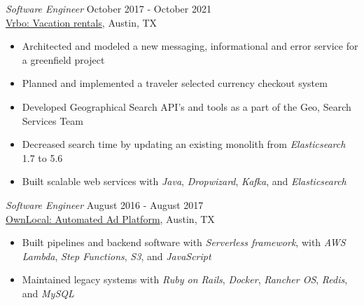 \documentclass[margin, 9pt]{res} %
\begin{document}
\begin{resume}
{\sl Software Engineer} \hfill October 2017 - October 2021 \\
\href{https://www.vrbo.com/}{Vrbo: Vacation rentals}, Austin, TX
\begin{itemize}
    \item Architected and modeled a new messaging, informational and error service for a greenfield project
    \item Planned and implemented a traveler selected currency checkout system
    \item Developed Geographical Search API's and tools as a part of the Geo, Search Services Team
    \item Decreased search time by updating an existing monolith from {\it Elasticsearch} 1.7 to 5.6
    \item Built scalable web services with {\it Java}, {\it Dropwizard}, {\it Kafka}, and {\it Elasticsearch}
\end{itemize}


{\sl Software Engineer } \hfill August 2016 - August 2017 \\
\href{https://www.ownlocal.com}{OwnLocal: Automated Ad Platform}, Austin, TX
\begin{itemize}
    \item Built pipelines and backend software with {\it Serverless framework}, with {\it AWS Lambda}, {\it Step Functions}, {\it S3}, and {\it JavaScript}
    \item Maintained legacy systems with {\it Ruby on Rails}, {\it Docker}, {\it Rancher OS}, {\it Redis}, and {\it MySQL}
\end{itemize}



\end{resume}
\end{document}
